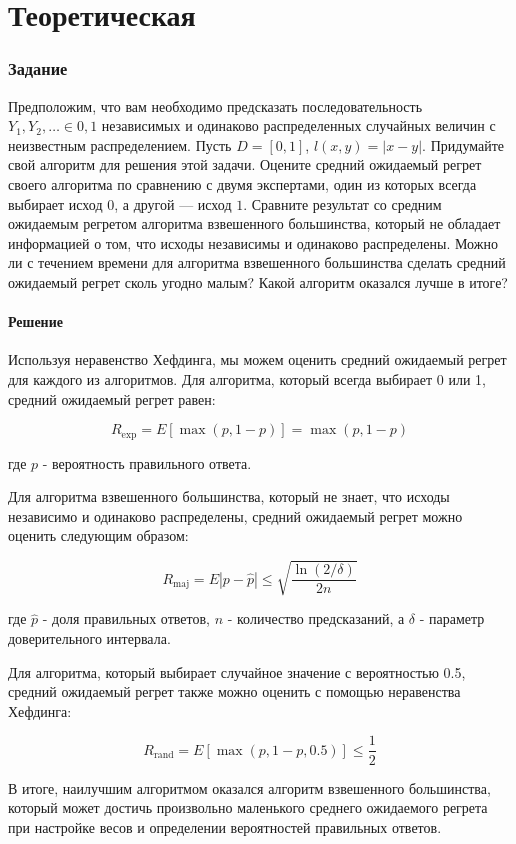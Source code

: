\documentclass[a4paper,14pt]{extarticle}
\begin{document}
\newpage

\part{Теоретическая}
\section{Задание }

Предположим, что вам необходимо предсказать последовательность $Y_1, Y_2, \ldots \in {0, 1}$ независимых и одинаково распределенных случайных величин с неизвестным распределением. Пусть $D = [0, 1]$, $l(x, y) = |x - y|$. Придумайте свой алгоритм для решения этой задачи. Оцените средний ожидаемый регрет своего алгоритма по сравнению с двумя экспертами, один из которых всегда выбирает исход $0$, а другой — исход $1$. Сравните результат со средним ожидаемым регретом алгоритма взвешенного большинства, который не обладает информацией о том, что исходы независимы и одинаково распределены. Можно ли с течением времени для алгоритма взвешенного большинства сделать средний ожидаемый регрет сколь угодно малым? Какой алгоритм оказался лучше в итоге?

\subsection{Решение}

Используя неравенство Хефдинга, мы можем оценить средний ожидаемый регрет для каждого из алгоритмов.
Для алгоритма, который всегда выбирает 0 или 1, средний ожидаемый регрет равен:

$$
R_{\exp }=E[\max (p, 1-p)]=\max (p, 1-p)
$$

где $p$ - вероятность правильного ответа.

Для алгоритма взвешенного большинства, который не знает, что исходы независимо и одинаково распределены, средний ожидаемый регрет можно оценить следующим образом:

$$
R_{\mathrm{maj}}=E\left|p-\hat{p}\right| \leq \sqrt{\frac{\ln (2 / \delta)}{2 n}}
$$

где $\hat{p}$ - доля правильных ответов, $n$ - количество предсказаний, а $\delta$ - параметр доверительного интервала.

Для алгоритма, который выбирает случайное значение с вероятностью 0.5, средний ожидаемый регрет также можно оценить с помощью неравенства Хефдинга:

$$
R_{\mathrm{rand}}=E[\max (p, 1-p, 0.5)] \leq \frac{1}{2}
$$

В итоге, наилучшим алгоритмом оказался алгоритм взвешенного большинства, который может достичь произвольно маленького среднего ожидаемого регрета при настройке весов и определении вероятностей правильных ответов.
\end{document}
